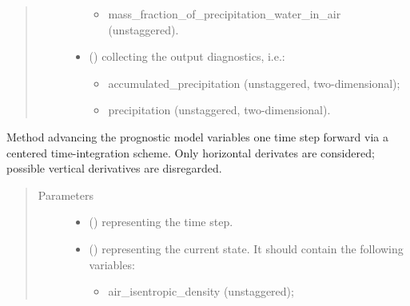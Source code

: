 \documentclass[letterpaper,10pt,english]{sphinxmanual}
\begin{document}
\begin{fulllineitems}
\begin{fulllineitems}
\begin{quote}
\begin{description}
\begin{itemize}
\begin{itemize}
\item {} 
mass\_fraction\_of\_precipitation\_water\_in\_air (unstaggered).

\end{itemize}

\item {} 
 () \textendash{}  collecting the output diagnostics, i.e.:
\begin{itemize}
\item {} 
accumulated\_precipitation (unstaggered, two-dimensional);

\item {} 
precipitation (unstaggered, two-dimensional).

\end{itemize}

\end{itemize}


\end{description}\end{quote}

\end{fulllineitems}


\begin{fulllineitems}
\label{\detokenize{api:dycore.prognostic_isentropic_nonconservative_centered.PrognosticIsentropicNonconservativeCentered.step_neglecting_vertical_advection}}
Method advancing the prognostic model variables one time step forward via a centered time-integration
scheme. Only horizontal derivates are considered; possible vertical derivatives are disregarded.
\begin{quote}\begin{description}
\item[{Parameters}] \leavevmode\begin{itemize}
\item {} 
 () \textendash{}  representing the time step.

\item {} 
 () \textendash{} 
{\hyperref[\detokenize{api:storages.state_isentropic.StateIsentropic}]{}} representing the current state.
It should contain the following variables:
\begin{itemize}
\item {} 
air\_isentropic\_density (unstaggered);


\end{itemize}
\end{itemize}
\end{description}
\end{quote}
\end{fulllineitems}
\end{fulllineitems}
\end{document}
